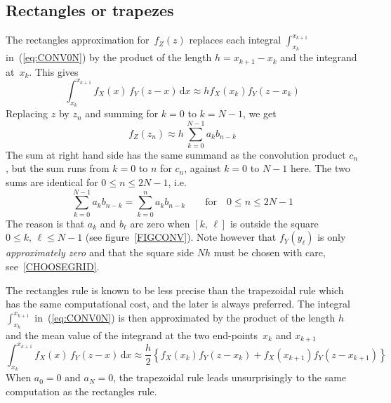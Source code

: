 \documentclass[11pt,a4paper]{report}\usepackage[]{graphicx}\usepackage[]{color}
\begin{document}
\subsection{Rectangles or trapezes}
The rectangles approximation for~$f_Z(z)$ replaces each integral
$\int_{x_{k}}^{x_{k+1}}$ in~(\ref{eq:CONV0N}) by the product of the length $h =
x_{k+1} - x_k$ and the integrand at~$x_k$. This gives
\begin{equation}
  \label{eq:RECT}
   \int_{x_{k}}^{x_{k+1}}f_X(x)\,f_Y(z-x)\,\mathrm{d}x 
   \approx  h f_X(x_k)f_Y(z - x_k) 
\end{equation}
Replacing $z$ by $z_n$ and summing for $k=0$ to $k=N-1$, we get
\begin{equation*}
   \label{eq:APPROX}
  f_Z(z_n) \approx h \,\sum_{k=0}^{N-1} a_k b_{n-k}
\end{equation*}
The sum at right hand side has the same summand as the 
convolution product $c_n$, but the sum runs from $k=0$ to $n$ for $c_n$, against
$k=0$ to $N-1$ here. The two sums are identical for $0 \leqslant n \leqslant 2N-1$, i.e.
\begin{equation}
  \label{eq:IDENT}
  \sum_{k=0}^{N-1} a_k b_{n-k} = \sum_{k=0}^{n} a_k b_{n-k} \qquad \textrm{for}\quad 
  0 \leqslant n \leqslant 2N-1
\end{equation}
The reason is that $a_k$ and $b_{\ell}$ are zero when $[k,\,\ell]$ is outside
the square $0 \leqslant k,\,\ell \leqslant N-1$ (see figure~\ref{FIGCONV}).  
Note however that $f_Y(y_\ell)$ is only \textit{approximately zero} and
that the square side $Nh$ must be chosen with care, see~\ref{CHOOSEGRID}.

The rectangles rule is known to be less precise than the trapezoidal rule which
has the same computational cost, and the later is always preferred. The integral
$\int_{x_{k}}^{x_{k+1}}$ in~(\ref{eq:CONV0N}) is then approximated by the
product of the length $h$ and the mean value of the integrand at the two
end-points~$x_k$ and $x_{k+1}$
\begin{equation}
  \label{eq:TRAP}
  \int_{x_{k}}^{x_{k+1}}f_X(x)\,f_Y(z-x)\,\mathrm{d}x 
  \approx \frac{h}{2} \left\{ f_X(x_k)f_Y(z - x_k) + f_X(x_{k+1})f_Y(z - x_{k+1}) \right\}
\end{equation}
When $a_0=0$ and $a_N=0$, the trapezoidal rule leads unsurprisingly
to the same computation as the rectangles rule.
\end{document}
